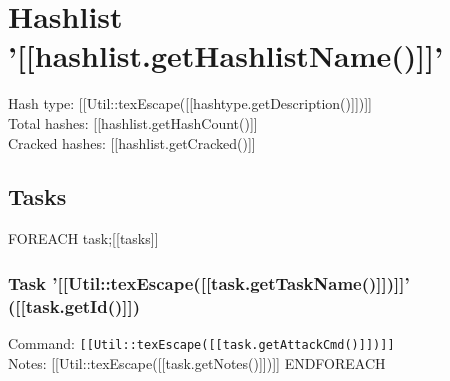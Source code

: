 \documentclass[12pt]{article}
\begin{document}
\section*{Hashlist '[[hashlist.getHashlistName()]]'}

Hash type: [[Util::texEscape([[hashtype.getDescription()]])]]\\
Total hashes: [[hashlist.getHashCount()]]\\
Cracked hashes: [[hashlist.getCracked()]]\\

\subsection*{Tasks}

{{FOREACH task;[[tasks]]}}
	\subsubsection*{Task '[[Util::texEscape([[task.getTaskName()]])]]' ([[task.getId()]])}
	Command: \texttt{[[Util::texEscape([[task.getAttackCmd()]])]]}\\
	Notes: [[Util::texEscape([[task.getNotes()]])]]
{{ENDFOREACH}}
\end{document}
